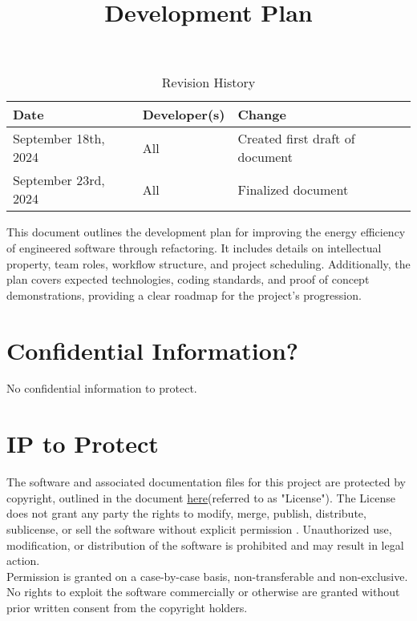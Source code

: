 \documentclass{article}
\title{Development Plan\\ \progname}
\author{\authname}
\date{}
\begin{document}
\maketitle

\begin{table}[hp]
  \caption{Revision History} \label{TblRevisionHistory}
  \begin{tabularx}{\textwidth}{llX}
    \toprule
    \textbf{Date} & \textbf{Developer(s)} & \textbf{Change}\\
    \midrule
    September 18th, 2024 & All & Created first draft of document\\
    September 23rd, 2024 & All & Finalized document\\
    \bottomrule
  \end{tabularx}
\end{table}

\newpage{}

\noindent
This document outlines the development plan for improving the energy efficiency of
engineered software through refactoring. It includes details on intellectual property,
team roles, workflow structure, and project scheduling. Additionally, the plan covers
expected technologies, coding standards, and proof of concept demonstrations, providing
a clear roadmap for the project's progression.

\section{Confidential Information?}

No confidential information to protect.
\section{IP to Protect}

\hspace{\parindent}The software and associated documentation files for this project are protected by copyright, outlined in the document \href{https://github.com/ssm-lab/capstone--source-code-optimizer/blob/documentation/LICENSE}{ here}(referred to as "License"). The License does not grant any party the rights to modify, merge, publish, distribute, sublicense, or sell the software without explicit permission .
Unauthorized use, modification, or distribution of the software is prohibited and may result in legal action.
\\
Permission is granted on a case-by-case basis, non-transferable and non-exclusive. No rights to exploit the software commercially or otherwise are granted without prior written consent from the copyright holders.
\end{document}
